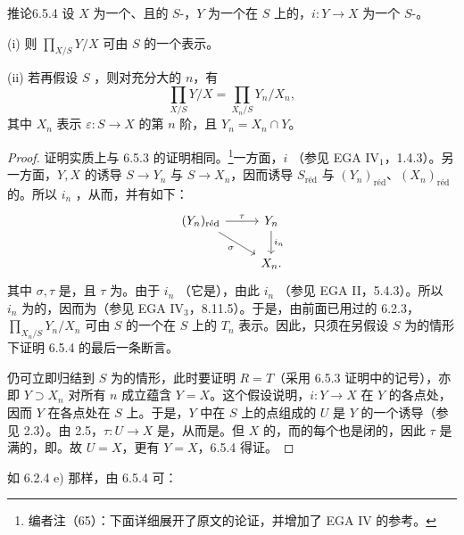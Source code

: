 \begin{SGAresult}{推论}{6.5.4}
设 $X$ 为一个、且的 $S$-，$Y$ 为一个在 $S$ 上的，$i:Y\to X$ 为一个 $S$-。

(i) 则 $\prod_{X/S}Y/X$ 可由 $S$ 的一个表示。

(ii) 若再假设 $S$ ，则对充分大的 $n$，有
\[
\prod_{X/S}Y/X=\prod_{X_n/S}Y_n/X_n,
\]
其中 $X_n$ 表示 $\varepsilon:S\to X$ 的第 $n$ 阶，且 $Y_n=X_n\cap Y$。
\end{SGAresult}
\begin{proof}
证明实质上与 6.5.3 的证明相同。\footnote{编者注（65）：下面详细展开了原文的论证，并增加了 EGA IV 的参考。}一方面，$i$ （参见 EGA $\mathrm{IV}_1$，1.4.3）。另一方面，$Y,X$ 的诱导 $S\to Y_n$ 与 $S\to X_n$，因而诱导 $S_{\mathrm{r\text{é}d}}$ 与 $(Y_n)_{\mathrm{r\text{é}d}}$、$(X_n)_{\mathrm{r\text{é}d}}$ 的。所以 $i_n$ ，从而，并有如下：
\[
\begin{tikzcd}
(Y_n)_{\mathrm{r\text{é}d}}\arrow[r,"\tau"]\arrow[dr,"\sigma"']&Y_n\arrow[d,"i_n"]\\
&X_n.
\end{tikzcd}
\]
其中 $\sigma,\tau$ 是，且 $\tau$ 为。由于 $i_n$ （它是），由此 $i_n$ （参见 EGA II，5.4.3）。所以 $i_n$ 为的，因而为（参见 EGA $\mathrm{IV}_3$，8.11.5）。于是，由前面已用过的 6.2.3，$\prod_{X_n/S}Y_n/X_n$ 可由 $S$ 的一个在 $S$ 上的 $T_n$ 表示。因此，只须在另假设 $S$ 为的情形下证明 6.5.4 的最后一条断言。

仍可立即归结到 $S$ 为的情形，此时要证明 $R=T$（采用 6.5.3 证明中的记号），亦即 $Y\supset X_n$ 对所有 $n$ 成立蕴含 $Y=X$。这个假设说明，$i:Y\to X$ 在 $Y$ 的各点处，因而 $Y$ 在各点处在 $S$ 上。于是，$Y$ 中在 $S$ 上的点组成的 $U$ 是 $Y$ 的一个诱导（参见 2.3）。由 2.5，$\tau:U\to X$ 是，从而是。但 $X$ 的，而的每个也是闭的，因此 $\tau$ 是满的，即。故 $U=X$，更有 $Y=X$，6.5.4 得证。
\end{proof}
如 6.2.4 e) 那样，由 6.5.4 可：

